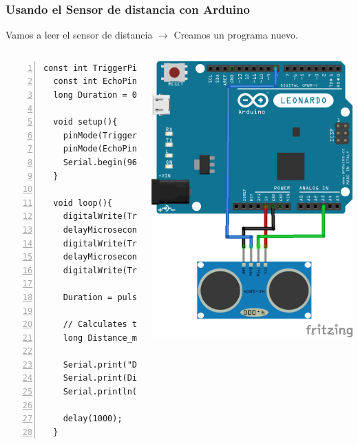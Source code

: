 \documentclass[compress]{beamer}
\begin{document}
\begin{frame}[fragile]
\frametitle{Usando el Sensor de distancia con Arduino}
Vamos a leer el sensor de distancia $\rightarrow$ Creamos un programa nuevo.
\begin{columns}
  \begin{Verbatim}[formatcom=\color{red},fontseries=b, numbers=left,numbersep=3pt,fontsize=\tiny]
  const int TriggerPinA = A3;
  const int EchoPinA = 8;
  long Duration = 0;
  
  void setup(){
    pinMode(TriggerPinA, OUTPUT)
    pinMode(EchoPinA, INPUT);
    Serial.begin(9600);
  }
  
  void loop(){ 
    digitalWrite(TriggerPinA, LOW);                   
    delayMicroseconds(2);
    digitalWrite(TriggerPinA, HIGH);
    delayMicroseconds(10);
    digitalWrite(TriggerPinA, LOW);
   
    Duration = pulseIn(EchoPinA, HIGH);

    // Calculates the Distance in mm
    long Distance_mm = ((Duration /2.9) / 2);
   
    Serial.print("Distance = ");
    Serial.print(Distance_mm);
    Serial.println(" mm");
   
    delay(1000);
  }
    \end{Verbatim} 

   \includegraphics[width=\columnwidth]{./img/arduino_hc-sr04.png}

\end{columns}
\end{frame}
\end{document}
